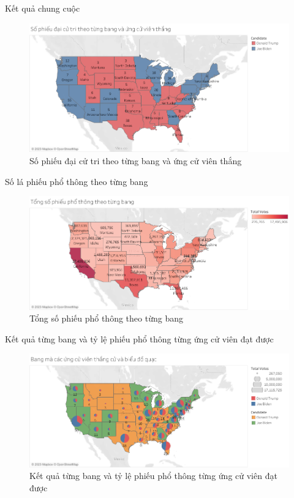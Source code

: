 \documentclass[10pt]{beamer}
\theoremstyle{remark}
\theoremstyle{definition}
\begin{document}
\begin{frame}{Kết quả chung cuộc}
	\begin{figure}[h!]
        \centering
        \includegraphics[width=\textwidth]{Electoral_Votes_States.png}
        \caption{Số phiếu đại cử tri theo từng bang và ứng cử viên thắng}
    \end{figure}
\end{frame}

\begin{frame}{Số lá phiếu phổ thông theo từng bang}
	\begin{figure}[h!]
        \centering
        \includegraphics[width=\textwidth]{Popular_Votes_States_by_Color.png}
        \caption{Tổng số phiếu phổ thông theo từng bang}
    \end{figure}
\end{frame}

\begin{frame}{Kết quả từng bang và tỷ lệ phiếu phổ thông từng ứng cử viên đạt được}
	\begin{figure}[h!]
        \centering
        \includegraphics[width=\textwidth]{figures/State_Win_Candidate_and_Pie_chart.png}
        \caption{Kết quả từng bang và tỷ lệ phiếu phổ thông từng ứng cử viên đạt được}
    \end{figure}
\end{frame}
\end{document}
